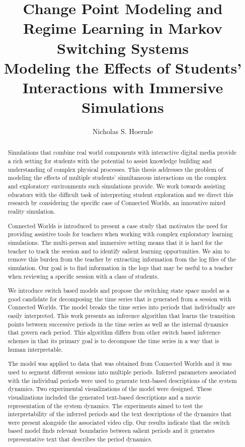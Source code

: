 \documentclass[11pt]{gsasthesis} %
\title{Change Point Modeling and Regime Learning in Markov Switching Systems \\
\large Modeling the Effects of Students' Interactions with Immersive Simulations} %
\author{Nicholas S. Hoernle} %
\begin{document}


\thesistitlepage
\begin{abstract}
Simulations that combine real world components with interactive digital media provide a rich setting for students with the potential to assist knowledge building and understanding of complex physical processes. This thesis addresses the problem of modeling the effects of multiple students' simultaneous interactions on the complex and exploratory environments such simulations provide. We work towards assisting educators with the difficult task of interpreting student exploration and we direct this research by considering the specific case of Connected Worlds, an innovative mixed reality simulation.

Connected Worlds is introduced to present a case study that motivates the need for providing assistive tools for teachers when working with complex exploratory learning simulations. The multi-person and immersive setting means that it is hard for the teacher to track the session and to identify salient learning opportunities. We aim to remove this burden from the teacher by extracting information from the log files of the simulation. Our goal is to find information in the logs that may be useful to a teacher when reviewing a specific session with a class of students.

We introduce switch based models and propose the switching state space model as a good candidate for decomposing the time series that is generated from a session with Connected Worlds. The model breaks the time series into periods that individually are easily interpreted. This work presents an inference algorithm that learns the transition points between successive periods in the time series as well as the internal dynamics that govern each period. This algorithm differs from other switch based inference schemes in that its primary goal is to decompose the time series in a way that is human interpretable.

The model was applied to data that was obtained from Connected Worlds and it was used to segment different sessions into multiple periods. Inferred parameters associated with the individual periods were used to generate text-based descriptions of the system dynamics. Two experimental visualizations of the model were designed. These visualizations included the generated text-based descriptions and a movie representation of the system dynamics. The experiments aimed to test the interpretability of the inferred periods and the text descriptions of the dynamics that were present alongside the associated video clip. Our results indicate that the switch based model finds relevant boundaries between salient periods and it generates representative text that describes the period dynamics.
\end{abstract}
\end{document}
